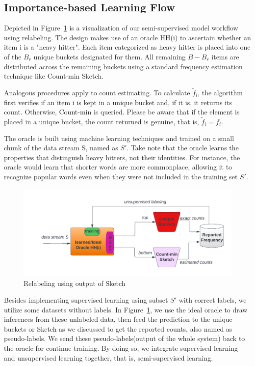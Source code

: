 \subsection{Importance-based Learning Flow}

Depicted in Figure~\ref{fig:relabel_flow} is a visualization of our semi-supervised model workflow using relabeling. The design makes use of an oracle HH(i) to ascertain whether an item i is a "heavy hitter". Each item categorized as heavy hitter is placed into one of the $B_{r}$ unique buckets designated for them. All remaining $B - B_{r}$ items are distributed across the remaining buckets using a standard frequency estimation technique like Count-min Sketch. 

Analogous procedures apply to count estimating. To calculate $\tilde{f}_i$, the algorithm first verifies if an item i is kept in a unique bucket and, if it is, it returns its count. Otherwise, Count-min is queried. Please be aware that if the element is placed in a unique bucket, the count returned is genuine, that is, $\tilde{f}_i = f_i$.

The oracle is built using machine learning techniques and trained on a small chunk of the data stream S, named as $S'$.
Take note that the oracle learns the properties that distinguish heavy hitters, not their identities. For instance, the oracle would learn that shorter words are more commonplace, allowing it to recognize popular words even when they were not included in the training set $S'$. 

\begin{figure}[htbp!]
\centering
\includegraphics[width=\textwidth]{images/workflow/relabeling.png}
\caption{Relabeling using output of Sketch}
\label{fig:relabel_flow}
\end{figure}

Besides implementing supervised learning using subset $S'$ with correct labels, we utilize some datasets without labels. In Figure~\ref{fig:relabel_flow}, we use the ideal oracle to draw inferences from these unlabeled data, then feed the prediction to the unique buckets or Sketch as we discussed to get the reported counts, also named as pseudo-labels. We send these pseudo-labels(output of the whole system) back to the oracle for continue training. By doing so, we integrate supervised learning and unsupervised learning together, that is, semi-supervised learning.



